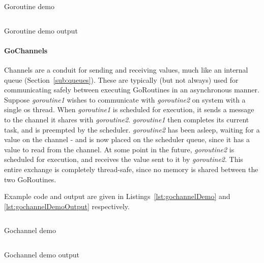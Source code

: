 \begin{listing}[ht]
  \centering
  \inputminted{go}{code/snippets/goroutineDemo.go}
  \caption{Goroutine demo\cite{goByExample}}
  \label{lst:goroutineDemo}
\end{listing}

\begin{listing}[ht]
  \centering
  \inputminted{bash}{code/goroutineDemoOutput}
  \caption{Goroutine demo output\cite{goByExample}}
  \label{lst:goroutineDemoOutput}
\end{listing}

\paragraph{GoChannels}

Channels are a conduit for sending and receiving values, much like an internal
queue (Section~\ref{sub:queues}). These are typically (but not always) used for
communicating safely between executing GoRoutines in an asynchronous manner.
Suppose \textit{goroutine1} wishes to communicate with \textit{goroutine2} on
system with a single \gls{os} thread. When \textit{goroutine1} is scheduled for
execution, it sends a message to the channel it shares with \textit{goroutine2}.
\textit{goroutine1} then completes its current task, and is \gls{preempted} by
the scheduler. \textit{goroutine2} has been asleep, waiting for a value on the
channel - and is now placed on the scheduler queue, since it has a value to read
from the channel. At some point in the future, \textit{goroutine2} is scheduled
for execution, and receives the value sent to it by \textit{goroutine2}. This
entire exchange is completely thread-safe, since no memory is shared between the
two GoRoutines.


Example code and output are given in Listings~\ref{lst:gochannelDemo} and
\ref{lst:gochannelDemoOutput} respectively.

\begin{listing}[ht]
  \centering
  \inputminted{go}{code/snippets/gochannelDemo.go}
  \caption{Gochannel demo\cite{goByExample}}
  \label{lst:gochannelDemo}
\end{listing}

\begin{listing}[ht]
  \centering
  \inputminted{bash}{code/gochannelDemoOutput}
  \caption{Gochannel demo output\cite{goByExample}}
  \label{lst:gochannelDemoOutput}
\end{listing}

